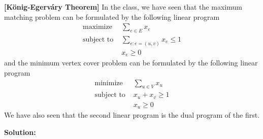 \documentclass{oxmathproblems}
\begin{document}
\begin{questions}
\miquestion[40]\textbf{[K\"{o}nig-Egerv\'{a}ry Theorem]}
In the class, we have seen that the maximum matching problem can be formulated by the following linear program
\begin{align*}
\text{maximize }& \sum_{e\in E}x_e \\
\text{subject to }&\sum_{e:e=(u,v)}x_e\leq 1  \tag{$\forall v\in V$}\\
&x_e\geq0\tag{$\forall e\in E$}
\end{align*}
and the minimum vertex cover problem can be formulated by the following linear program
\begin{align*}
\text{minimize }& \sum_{u\in V}x_u \\
\text{subject to }&x_u+x_v\geq 1  \tag{$\forall (u,v)\in E$}\\
&x_u\geq0\tag{$\forall u\in V$}
\end{align*}
We have also seen that the second linear program is the dual program of the first.

\textbf{Solution:}
\begin{parts}

\end{parts}
\end{questions}
\end{document}
